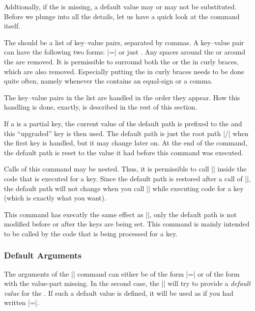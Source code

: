 Addtionally, if the  is missing, a default value may or
may not be substituted. Before we plunge into all the details,
let us have a quick look at the command itself.

\begin{command}{\pgfkeys{}}
  The  should be a list of key--value pairs, separated
  by commas. A key--value pair can have the following two forms:
  |=| or just . Any spaces around the
   or around the  are removed. It is permissible
  to surround both the  or the  in curly braces,
  which are also removed. Especially putting the  in curly
  braces needs to be done quite often, namely whenever the 
  contains an equal-sign or a comma.

  The key--value pairs in the list are handled in the order they
  appear. How this handling is done, exactly, is described in the rest
  of this section.

  If a  is a partial key, the current value of the default
  path is prefixed to the  and this ``upgraded'' key is
  then used. The default path is just the root path |/| when the first
  key is handled, but it may change later on. At the end of the
  command, the default path is reset to the value it had before this
  command was executed. 
  
  Calls of this command may be nested. Thus, it is permissible to call
  |\pgfkeys| inside the code that is executed for a key. Since the
  default path is restored after a call of |\pgfkeys|, the default
  path will not change when you call |\pgfkeys| while executing code
  for a key (which is exactly what you want).
\end{command}


\begin{command}{\pgfkeysalso{}}
  This command has execatly the same effect as |\pgfkeys|, only the
  default path is not modified before or after the keys are being
  set. This command is mainly intended to be called by the code that
  is being processed for a key.
\end{command}


\subsubsection{Default Arguments}

The arguments of the |\pgfkeys| command can either be of the form
|=| or of the form  with the
value-part missing. In the second case, the |\pgfkeys| will try to
provide a \emph{default value} for the . If such a default
value is defined, it will be used as if you had written
|=|.

